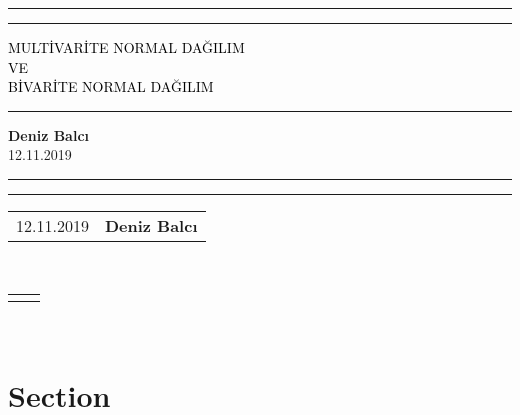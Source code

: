 \documentclass[a4paper, 15pt, oneside]{article}
\newcommand{\hmwkTitle}{MULTİVARİTE NORMAL DAĞILIM }
\newcommand{\hmwkDueDate}{12.11.2019}
\newcommand{\hmwkAuthorName}{\textbf{Deniz Balcı}}
\renewcommand{\line}{\begin{tabularx}{\textwidth}{X>{\raggedleft}X}\hline\\\end{tabularx}\\[-0.5cm]}
\newcommand{\leftright}[2]{\begin{tabularx}{\textwidth}{X>{\raggedleft}X}#1%
& #2\\\end{tabularx}\\[-0.5cm]}
\begin{document}
\begin{titlepage} %
	
	\centering %
	
	
	\rule{\textwidth}{1pt} %
	
	\vspace{2pt}\vspace{-\baselineskip} %
	
	\rule{\textwidth}{0.4pt} %
	
	\vspace{0.1\textheight} %
	
	
	\textcolor{Black}{ %
		{\Huge \hmwkTitle}\\[0.5\baselineskip] %
		{\Huge VE }\\[0.5\baselineskip] %
		{\Huge BİVARİTE NORMAL DAĞILIM}\\[0.5\baselineskip] %
	}
	
	\vspace{0.025\textheight} %
	
	\rule{0.3\textwidth}{0.4pt} %
	
	\vspace{0.1\textheight} %
	  
	
	{\Huge \hmwkAuthorName} \\
	 \vspace{0.025\textheight}
	{\Large \hmwkDueDate}
	\vfill %
	

	
	\rule{\textwidth}{0.4pt} %
	
	\vspace{2pt}\vspace{-\baselineskip} %
	
	\rule{\textwidth}{1pt} %
	
\end{titlepage}
\pagebreak
\newpage

\tableofcontents
\newpage
\leftright{\hmwkDueDate}{\hmwkAuthorName} 
\line




\section{Section}
\end{document}
